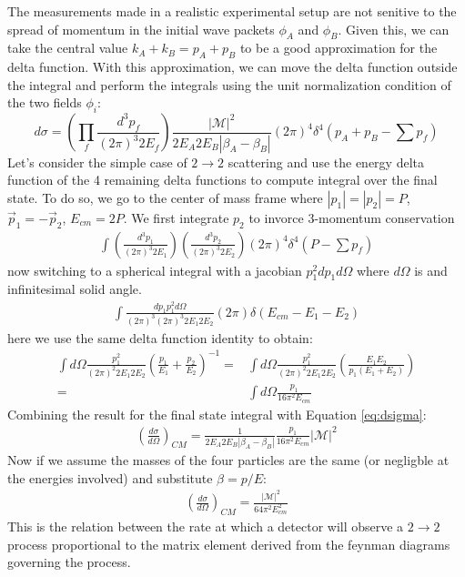 The measurements made in a realistic experimental setup are not senitive to the
spread of momentum in the initial wave packets $\phi_A$ and $\phi_B$. Given this, we can take the central value $k_A+k_B=p_A+p_B$
to be a good approximation for the delta function. With this approximation, we can move the delta function outside the integral and
perform the integrals using the unit normalization condition of the two fields $\phi_i$:
\begin{equation} \label{eq:dsigma}
d\sigma = \left( \prod_f \frac{d^3p_f}{(2\pi)^3 2E_f} \right ) \frac{|\mathcal{M}|^2}{2E_A2E_B|\beta_A - \beta_B|} (2\pi)^4
\delta^4 \left (p_A+p_B - \sum p_f  \right )
\end{equation}
Let's consider the simple case of $2 \rightarrow 2$ scattering and use the energy delta function 
of the 4 remaining delta functions to compute integral over the final state.
To do so, we go to the center of mass frame where $|p_1| = |p_2|= P$, $\vec p_1 = - \vec p_2$, $E_{cm} = 2P$. We first
integrate $p_2$ to invorce 3-momentum conservation  
\begin{align*}
\int \left( \frac{d^3p_1}{(2\pi)^3 2E_1} \right )\left( \frac{d^3p_2}{(2\pi)^3 2E_2} \right )  (2\pi)^4 \delta^4( P - \sum p_f ) 
\end{align*}
now switching to a spherical integral with a jacobian $p_1^2 dp_1 d\Omega$ where $d\Omega$ is and infinitesimal solid angle.
\begin{align*}
\int \frac{dp_1 p_1^2 d\Omega}{(2\pi)^3 (2\pi)^3 2E_1 2E_2} (2\pi)\delta( E_{cm} -E_1 - E_2)
\end{align*}
here we use the same delta function identity to obtain:
\begin{align*}
\int d\Omega \frac{p_1^2}{(2\pi)^2 2E_1 2E_2} \left ( \frac{p_1}{E_1} + \frac{p_2}{E_2} \right )^{-1} = &\int d\Omega \frac{p_1^2}{(2\pi)^2 2E_1 2E_2} \left ( \frac{E_1E_2}{p_1(E_1+E_2)} \right ) 
\\= &\int d\Omega \frac{p_1}{16\pi^2 E_{cm}}
\end{align*}
Combining the result for the final state integral with Equation \ref{eq:dsigma}:
\begin{align*}
\left (\frac{d\sigma}{d\Omega} \right)_{CM}  = \frac{1}{2E_A2E_B|\beta_A - \beta_B|}  \frac{p_1}{16\pi^2 E_{cm}} |\mathcal{M}|^2
\end{align*}
Now if we assume the masses of the four particles are the same (or negligble at the energies involved) 
and substitute $\beta = p / E$:
\begin{align*}
\left (\frac{d\sigma}{d\Omega}\right)_{CM}  = \frac{|\mathcal{M}|^2}{64\pi^2E_{cm}^2} 
\end{align*}
This is the relation between the rate at which a detector will observe a $2\rightarrow 2$ process proportional to 
the matrix element derived from the feynman diagrams governing the process. 

